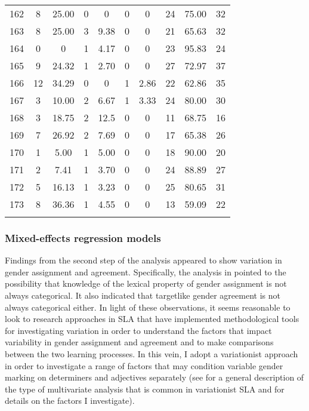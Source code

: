 \documentclass[output=paper,colorlinks,citecolor=brown,modfonts,nonflat]{../langscibook}
\begin{document}
\begin{table}[t]
{\begin{tabular}{r S[table-format=2]S[table-format=2.2] S[table-format=1]S[table-format=2.2] S[table-format=1]S[table-format=2.2] S[table-format=2]S[table-format=2.2] r}
 162 &  8 &  25.00 &  0 &  0 &  0 &  0 &  24 &  75.00 &  32\\
 163 &  8 &  25.00 &  3 &  9.38 &  0 &  0 &  21 &  65.63 &  32\\
 164 &  0 &  0 &  1 &  4.17 &  0 &  0 &  23 &  95.83 &  24\\
 165 &  9 &  24.32 &  1 &  2.70 &  0 &  0 &  27 &  72.97 &  37\\
 166 &  12 &  34.29 &  0 &  0 &  1 &  2.86 &  22 &  62.86 &  35\\
 167 &  3 &  10.00 &  2 &  6.67 &  1 &  3.33 &  24 &  80.00 &  30\\
 168 &  3 &  18.75 &  2 &  12.5 &  0 &  0 &  11 &  68.75 &  16\\
 169 &  7 &  26.92 &  2 &  7.69 &  0 &  0 &  17 &  65.38 &  26\\
 170 &  1 &  5.00 &  1 &  5.00 &  0 &  0 &  18 &  90.00 &  20\\
 171 &  2 &  7.41 &  1 &  3.70 &  0 &  0 &  24 &  88.89 &  27\\
 172 &  5 &  16.13 &  1 &  3.23 &  0 &  0 &  25 &  80.65 &  31\\
 173 &  8 &  36.36 &  1 &  4.55 &  0 &  0 &  13 &  59.09 &  22\\
\lspbottomrule
\end{tabular}}
\end{table}

\subsubsection{Mixed-effects regression models}\label{sec:gudmestad:3.2.3}

Findings from the second step of the analysis appeared to show variation in gender assignment and agreement. Specifically, the analysis in  pointed to the possibility that knowledge of the lexical property of gender assignment is not always categorical. It also indicated that targetlike gender agreement is not always categorical either. In light of these observations, it seems reasonable to look to research approaches in SLA that have implemented methodological tools for investigating variation in order to understand the factors that impact variability in gender assignment and agreement and to make comparisons between the two learning processes. In this vein, I adopt a variationist approach in order to investigate a range of factors that may condition variable gender marking on determiners and adjectives separately (see  for a general description of the type of multivariate analysis that is common in variationist SLA and for details on the factors I investigate).
\end{document}
